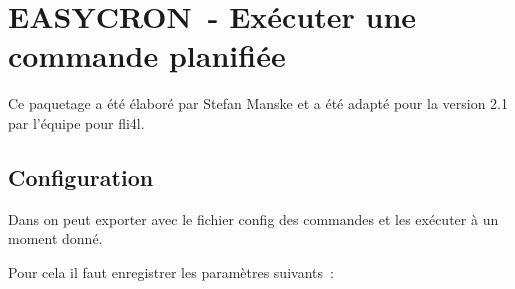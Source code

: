 
{
\section {EASYCRON~- Exécuter une commande planifiée}
}

Ce paquetage a été élaboré par Stefan Manske
 et a été adapté pour la version 2.1 par
l'équipe pour fli4l.


\subsection{Configuration}

      Dans  on peut exporter avec le fichier config des
      commandes et les exécuter à un moment donné.

      Pour cela il faut enregistrer les paramètres suivants~:

